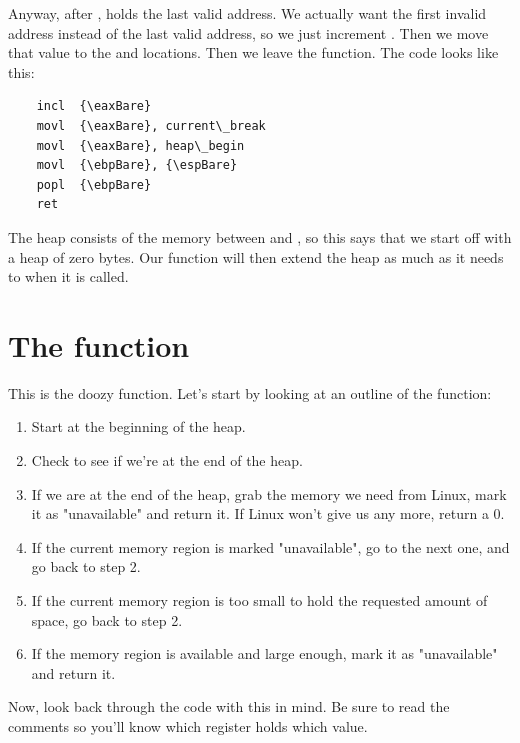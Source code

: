 Anyway, after , 
\icode{{\eaxBare}} holds the last valid address.  
We actually want the first invalid address instead of the last valid address, so we just increment \icode{{\eaxBare}}.  Then
we move that value to the  and 
locations.  
Then we leave the function.  The code looks like this:

\begin{simpletyping}
\begin{lstlisting}
	incl  {\eaxBare}
	movl  {\eaxBare}, current\_break
	movl  {\eaxBare}, heap\_begin
	movl  {\ebpBare}, {\espBare}
	popl  {\ebpBare}
	ret
\end{lstlisting}
\end{simpletyping}

The heap consists of the memory between  and
, so this says that we start off with a heap of zero bytes.
Our  function will then extend the heap as much as it needs to
when it is called.

\section{The  function}

This is the doozy function.  Let's start by looking at an outline of the function:

\begin{enumerate}
\item Start at the beginning of the heap. 
\item Check to see if we're at the end of the heap. 
\item If we are at the end of the heap, grab the memory we need from Linux, mark it
as "unavailable" and return it.  If Linux won't give us any more, return a 0. 
\item If the current memory region is marked "unavailable", go to the next one, and go
back to step 2. 
\item If the current memory region is too small to hold the requested amount of space,
go back to step 2. 
\item If the memory region is available and large enough, mark it as "unavailable" and
return it. 
\end{enumerate}

Now, look back through the code with this in mind.  Be sure to read the comments so you'll know 
which register holds which value.  

